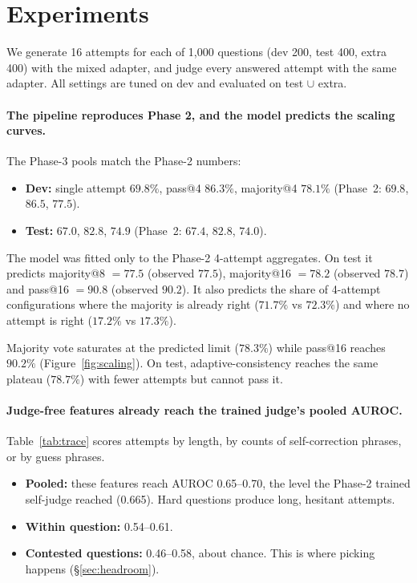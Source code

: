 \section{Experiments}
\label{sec:results}

We generate 16 attempts for each of 1,000 questions (dev 200, test 400, extra 400) with the mixed adapter, and judge
every answered attempt with the same adapter. All settings are tuned on dev and evaluated on test $\cup$ extra.

\paragraph{The pipeline reproduces Phase 2, and the model predicts the scaling curves.}
The Phase-3 pools match the Phase-2 numbers:
\begin{itemize}
\item \textbf{Dev:} single attempt $69.8\%$, pass@4 $86.3\%$, majority@4 $78.1\%$ (Phase~2: $69.8$, $86.5$, $77.5$).
\item \textbf{Test:} $67.0$, $82.8$, $74.9$ (Phase~2: $67.4$, $82.8$, $74.0$).
\end{itemize}
The model was fitted only to the Phase-2 4-attempt aggregates. On test it predicts majority@8 $=77.5$ (observed
$77.5$), majority@16 $=78.2$ (observed $78.7$) and pass@16 $=90.8$ (observed $90.2$). It also predicts the share of
4-attempt configurations where the majority is already right ($71.7\%$ vs $72.3\%$) and where no attempt is right
($17.2\%$ vs $17.3\%$).

Majority vote saturates at the predicted limit ($78.3\%$) while pass@16 reaches $90.2\%$ (Figure~\ref{fig:scaling}).
On test, adaptive-consistency reaches the same plateau ($78.7\%$) with fewer attempts but cannot pass it.

\paragraph{Judge-free features already reach the trained judge's pooled AUROC.}
Table~\ref{tab:trace} scores attempts by length, by counts of self-correction phrases, or by guess phrases.

\begin{itemize}
\item \textbf{Pooled:} these features reach AUROC 0.65--0.70, the level the Phase-2 trained self-judge reached
  (0.665). Hard questions produce long, hesitant attempts.
\item \textbf{Within question:} 0.54--0.61.
\item \textbf{Contested questions:} 0.46--0.58, about chance. This is where picking happens (\S\ref{sec:headroom}).
\end{itemize}

